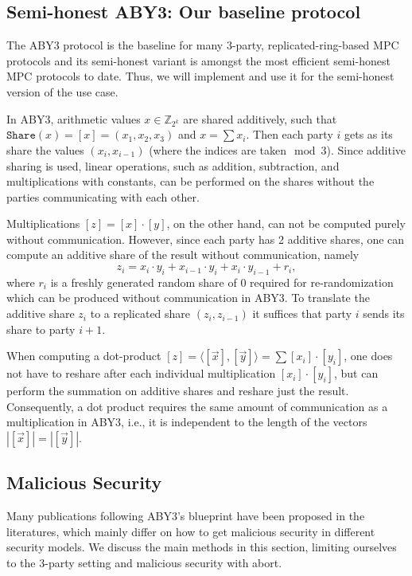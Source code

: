 \documentclass[a4paper,11pt,
]{article}
\newcommand{\Z}{\ensuremath{\mathbb{Z}}\xspace}
\newcommand{\shared}[1]{\ensuremath{[{#1}]}}
\begin{document}
\subsection{Semi-honest ABY3: Our baseline protocol}

The ABY3 \cite{DBLP:conf/ccs/MohasselR18} protocol is the baseline for many 3-party, replicated-ring-based MPC protocols and its semi-honest variant is amongst the most efficient semi-honest MPC protocols to date. Thus, we will implement and use it for the semi-honest version of the use case.

In ABY3, arithmetic values $x \in \Z_{2^k}$ are shared additively, such that $\texttt{Share}(x) = \shared{x} = (x_1, x_2, x_3)$ and $x = \sum x_i$. Then each party $i$ gets as its share the values $(x_i, x_{i-1})$ (where the indices are taken$\mod 3$). Since additive sharing is used, linear operations, such as addition, subtraction, and multiplications with constants, can be performed on the shares without the parties communicating with each other.

Multiplications $\shared{z} = \shared{x} \cdot \shared{y}$, on the other hand, can not be computed purely without communication. However, since each party has 2 additive shares, one can compute an additive share of the result without communication, namely
$$
    z_i = x_i \cdot y_i + x_{i-1} \cdot y_i + x_i \cdot y_{i-1} + r_i,
$$
where $r_i$ is a freshly generated random share of 0 required for re-randomization which can be produced without communication in ABY3.
To translate the additive share $z_i$ to a replicated share $(z_i, z_{i-1})$ it suffices that party $i$ sends its share to party $i+1$.

When computing a dot-product $\shared{z} = \langle\shared{\vec{x}}, \shared{\vec{y}}\rangle = \sum \shared{x_i} \cdot \shared{y_i}$, one does not have to reshare after each individual multiplication $\shared{x_i} \cdot \shared{y_i}$, but can perform the summation on additive shares and reshare just the result. Consequently, a dot product requires the same amount of communication as a multiplication in ABY3, i.e., it is independent to the length of the vectors $|\shared{\vec{x}}| = |\shared{\vec{y}}|$.

\subsection{Malicious Security}

Many publications following ABY3's blueprint have been proposed in the literatures, which mainly differ on how to get malicious security in different security models. We discuss the main methods in this section, limiting ourselves to the 3-party setting and malicious security with abort.
\end{document}
